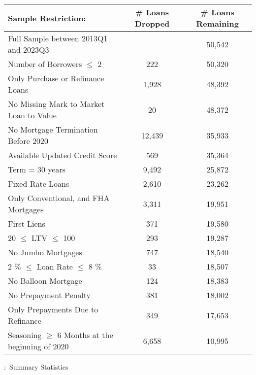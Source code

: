 \documentclass[11pt]{article}
\begin{document}
{\begin{table}[!h]
\begin{tabular}{p{10cm}cc}
\textbf{Sample Restriction:} & \textbf{\# Loans Dropped} & \textbf{\# Loans Remaining} \\
\midrule
Full Sample between 2013Q1 and 2023Q3         &         & 50,542 \\
Number of Borrowers $\leq$   2      &       222  & 50,320 \\
Only Purchase or Refinance Loans      &       1,928  & 48,392 \\
No Missing Mark to Market Loan to Value & 20 &  48,372 \\
No Mortgage Termination Before 2020 & 12,439 & 35,933 \\
Available Updated Credit Score & 569 & 35,364 \\
Term = 30 years                                  &     9,492    &    25,872      \\
Fixed Rate Loans                                 &    2,610     &     23,262     \\
Only Conventional, and FHA Mortgages                                &    3,311     &     19,951     \\
First Liens                                      &     371    &      19,580    \\
20 $\leq$ LTV $\leq$ 100                         &    293     &       19,287  \\
No Jumbo Mortgages  &    747     &        18,540   \\
2 \% $\leq$ Loan Rate $\leq$ 8 \%                         &    33     &       18,507  \\
No Balloon Mortgage             &  124  &  18,383  \\
No Prepayment Penalty     &   381     &        18,002   \\
Only Prepayments Due to Refinance     &   349     &        17,653   \\
Seasoning $\geq$ 6 Months at the beginning of 2020                      & 6,658  & 10,995 \\
\bottomrule
\end{tabular}
\end{table}






\begin{table}[!h]
\captionsetup{justification=justified,singlelinecheck=false}
\footnotesize
\caption{:\ Summary Statistics}
\label{tab:sumstat}
\vspace{0.5em}


\end{table}}
\end{document}
